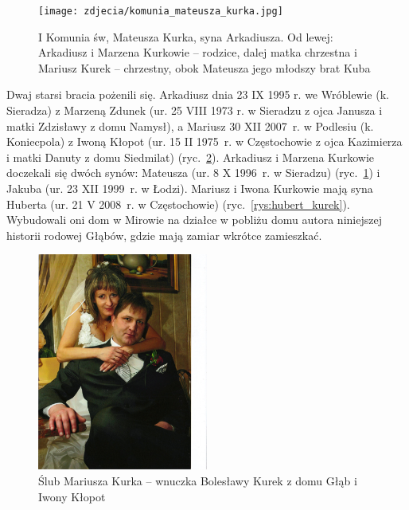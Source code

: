 \begin{figure}[!h]
\begin{center}
\texttt{[image: zdjecia/komunia\_mateusza\_kurka.jpg]}
\caption[I Komunia św, Mateusza Kurka]{I Komunia św, Mateusza Kurka, syna Arkadiusza. Od lewej: Arkadiusz i Marzena Kurkowie -- rodzice, dalej matka chrzestna i Mariusz Kurek -- chrzestny, obok Mateusza jego młodszy brat Kuba}
\label{rys:komunia_mateusza_kurka}
\end{center}
\end{figure}

Dwaj starsi bracia pożenili się. Arkadiusz dnia 23 IX 1995 r. we Wróblewie (k. Sieradza) z Marzeną Zdunek (ur. 25 VIII 1973 r. w Sieradzu z ojca Janusza i matki Zdzisławy z domu Namysł), a Mariusz 30 XII 2007~r. w Podlesiu (k. Koniecpola) z Iwoną Kłopot (ur. 15 II 1975~r. w Częstochowie z ojca Kazimierza i matki Danuty z domu Siedmilat) (ryc.~\ref{rys:mariusz_i_iwona_kurek}). Arkadiusz i Marzena Kurkowie doczekali się dwóch synów: Mateusza (ur. 8 X 1996~r. w Sieradzu) (ryc.~\ref{rys:komunia_mateusza_kurka}) i Jakuba (ur. 23 XII 1999~r. w Łodzi). Mariusz i Iwona Kurkowie mają syna Huberta (ur. 21 V 2008~r. w Częstochowie) (ryc.~\ref{rys:hubert_kurek}). Wybudowali oni dom w Mirowie na działce w pobliżu domu autora niniejszej historii rodowej Głąbów, gdzie mają zamiar wkrótce zamieszkać.


\begin{figure}[!h]
\begin{center}
\includegraphics[width=0.5\textwidth]{zdjecia/mariusz_i_iwona_kurek.jpg}
\caption[Ślub Mariusza Kurka z Iwoną Kłopot]{Ślub Mariusza Kurka -- wnuczka Bolesławy Kurek z domu Głąb i Iwony Kłopot}
\label{rys:mariusz_i_iwona_kurek}
\end{center}
\end{figure}

